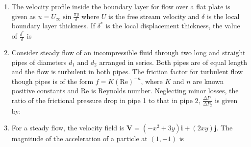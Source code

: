 \documentclass[journal]{IEEEtran}
\begin{document}
\begin{enumerate}[leftmargin=0pt]
    \item The velocity profile inside the boundary layer for flow over a flat plate is given as $u = U_\infty \sin \frac{\pi y}{\delta}$ where $U$ is the free stream velocity and $\delta$ is the local boundary layer thickness. If $\delta^*$ is the local displacement thickness, the value of $\frac{\delta^*}{\delta}$ is
    \hfill{}
    \begin{enumerate}
    \end{enumerate}

    \item Consider steady flow of an incompressible fluid through two long and straight pipes of diameters $d_1$ and $d_2$ arranged in series. Both pipes are of equal length and the flow is turbulent in both pipes. The friction factor for turbulent flow though pipes is of the form $f = K (\text{Re})^{-n}$, where $K$ and $n$ are known positive constants and Re is Reynolds number. Neglecting minor losses, the ratio of the frictional pressure drop in pipe 1 to that in pipe 2, $\frac{\Delta P_1}{\Delta P_2}$ is given by:
    \hfill{}
    \begin{enumerate}
    \end{enumerate}

    \item For a steady flow, the velocity field is $\mathbf{V} = (-x^2 + 3y)\mathbf{i} + (2xy)\mathbf{j}$. The magnitude of the acceleration of a particle at $(1, -1)$ is
    \hfill{}
    \begin{enumerate}
    \end{enumerate}


\end{enumerate}
\end{document}
